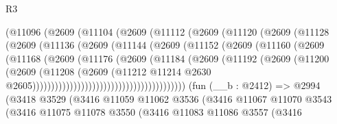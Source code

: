 \begin{lexlean}{R3}
\begin{coremodule}
                        (@11096
                          (@2609
                            (@11104
                              (@2609
                                (@11112
                                  (@2609
                                    (@11120
                                      (@2609
                                        (@11128
                                          (@2609
                                            (@11136
                                              (@2609
                                                (@11144
                                                  (@2609
                                                    (@11152
                                                      (@2609
                                                        (@11160
                                                          (@2609
                                                            (@11168
                                                              (@2609
                                                                (@11176
                                                                  (@2609
                                                                    (@11184
                                                                      (@2609
                                                                        (@11192
                                                                          (@2609
                                                                            (@11200
                                                                              (@2609
                                                                                (@11208
                                                                                  (@2609
                                                                                    (@11212
                                                                                      @11214
                                                                                      @2630
                                                                                      @2605)))))))))))))))))))))))))))))))))))))))))
    (fun (__b : @2412) =>
    @2994
      (@3418
        @3529
        (@3416
          @11059
          @11062
          @3536
          (@3416
            @11067
            @11070
            @3543
            (@3416
              @11075
              @11078
              @3550
              (@3416
                @11083
                @11086
                @3557
                (@3416

\end{coremodule}
\end{lexlean}
